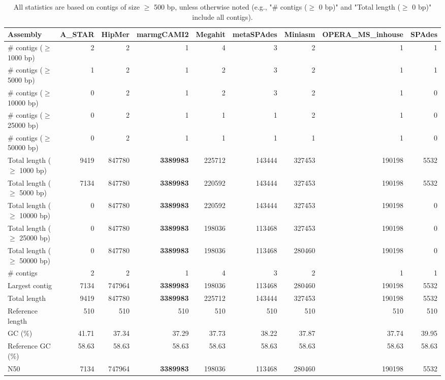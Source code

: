 \documentclass[12pt,a4paper]{article}
\begin{document}
\begin{table}[ht]
\begin{center}
\caption{All statistics are based on contigs of size $\geq$ 500 bp, unless otherwise noted (e.g., "\# contigs ($\geq$ 0 bp)" and "Total length ($\geq$ 0 bp)" include all contigs).}
\begin{tabular}{|l*{8}{|r}|}
\hline
Assembly & A\_STAR & HipMer & marmgCAMI2 & Megahit & metaSPAdes & Miniasm & OPERA\_MS\_inhouse & SPAdes \\ \hline
\# contigs ($\geq$ 1000 bp) & 2 & 2 & 1 & 4 & 3 & 2 & 1 & 1 \\ \hline
\# contigs ($\geq$ 5000 bp) & 1 & 2 & 1 & 2 & 3 & 2 & 1 & 1 \\ \hline
\# contigs ($\geq$ 10000 bp) & 0 & 2 & 1 & 2 & 3 & 2 & 1 & 0 \\ \hline
\# contigs ($\geq$ 25000 bp) & 0 & 2 & 1 & 1 & 1 & 2 & 1 & 0 \\ \hline
\# contigs ($\geq$ 50000 bp) & 0 & 2 & 1 & 1 & 1 & 1 & 1 & 0 \\ \hline
Total length ($\geq$ 1000 bp) & 9419 & 847780 & {\bf 3389983} & 225712 & 143444 & 327453 & 190198 & 5532 \\ \hline
Total length ($\geq$ 5000 bp) & 7134 & 847780 & {\bf 3389983} & 220592 & 143444 & 327453 & 190198 & 5532 \\ \hline
Total length ($\geq$ 10000 bp) & 0 & 847780 & {\bf 3389983} & 220592 & 143444 & 327453 & 190198 & 0 \\ \hline
Total length ($\geq$ 25000 bp) & 0 & 847780 & {\bf 3389983} & 198036 & 113468 & 327453 & 190198 & 0 \\ \hline
Total length ($\geq$ 50000 bp) & 0 & 847780 & {\bf 3389983} & 198036 & 113468 & 280460 & 190198 & 0 \\ \hline
\# contigs & 2 & 2 & 1 & 4 & 3 & 2 & 1 & 1 \\ \hline
Largest contig & 7134 & 747964 & {\bf 3389983} & 198036 & 113468 & 280460 & 190198 & 5532 \\ \hline
Total length & 9419 & 847780 & {\bf 3389983} & 225712 & 143444 & 327453 & 190198 & 5532 \\ \hline
Reference length & 510 & 510 & 510 & 510 & 510 & 510 & 510 & 510 \\ \hline
GC (\%) & 41.71 & 37.34 & 37.29 & 37.73 & 38.22 & 37.87 & 37.74 & 39.95 \\ \hline
Reference GC (\%) & 58.63 & 58.63 & 58.63 & 58.63 & 58.63 & 58.63 & 58.63 & 58.63 \\ \hline
N50 & 7134 & 747964 & {\bf 3389983} & 198036 & 113468 & 280460 & 190198 & 5532 \\ \hline

\end{tabular}
\end{center}
\end{table}
\end{document}
